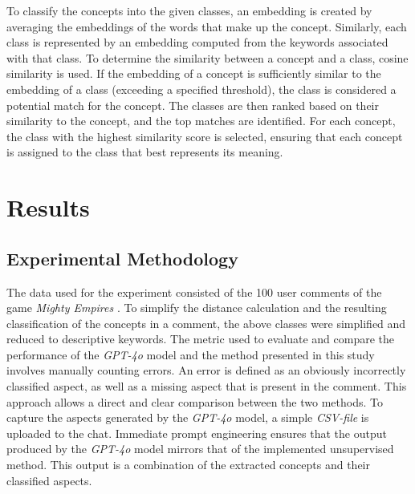 \documentclass[sn-mathphys-num]{sn-jnl}%
\theoremstyle{thmstyleone}%
\theoremstyle{thmstyletwo}%
\theoremstyle{thmstylethree}%
\begin{document}
    To classify the concepts into the given classes, an embedding is created by averaging the embeddings of the words that make up the concept. Similarly, each class is represented by an embedding computed from the keywords associated with that class. To determine the similarity between a concept and a class, cosine similarity is used. If the embedding of a concept is sufficiently similar to the embedding of a class (exceeding a specified threshold), the class is considered a potential match for the concept. The classes are then ranked based on their similarity to the concept, and the top matches are identified. For each concept, the class with the highest similarity score is selected, ensuring that each concept is assigned to the class that best represents its meaning.

\section{Results}\label{results}
    \subsection{Experimental Methodology}
    The data used for the experiment consisted of the 100 user comments of the game \textit{Mighty Empires} \cite{mightyempires1990}. To simplify the distance calculation and the resulting classification of the concepts in a comment, the above classes were simplified and reduced to descriptive keywords. The metric used to evaluate and compare the performance of the \textit{GPT-4o} model and the method presented in this study involves manually counting errors. An error is defined as an obviously incorrectly classified aspect, as well as a missing aspect that is present in the comment. This approach allows a direct and clear comparison between the two methods. To capture the aspects generated by the \textit{GPT-4o} model, a simple \textit{CSV-file} is uploaded to the chat. Immediate prompt engineering ensures that the output produced by the \textit{GPT-4o} model mirrors that of the implemented unsupervised method. This output is a combination of the extracted concepts and their classified aspects.
\end{document}
